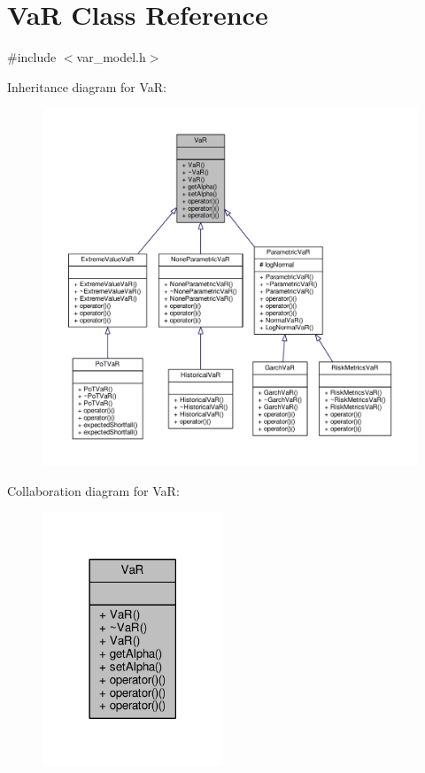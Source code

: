 \hypertarget{classVaR}{}\section{VaR Class Reference}
\label{classVaR}


{\ttfamily \#include $<$var\+\_\+model.\+h$>$}



Inheritance diagram for VaR\+:
\nopagebreak
\begin{figure}[H]
\begin{center}
\leavevmode
\includegraphics[width=350pt]{classVaR__inherit__graph}
\end{center}
\end{figure}


Collaboration diagram for VaR\+:
\nopagebreak
\begin{figure}[H]
\begin{center}
\leavevmode
\includegraphics[width=153pt]{classVaR__coll__graph}
\end{center}
\end{figure}
